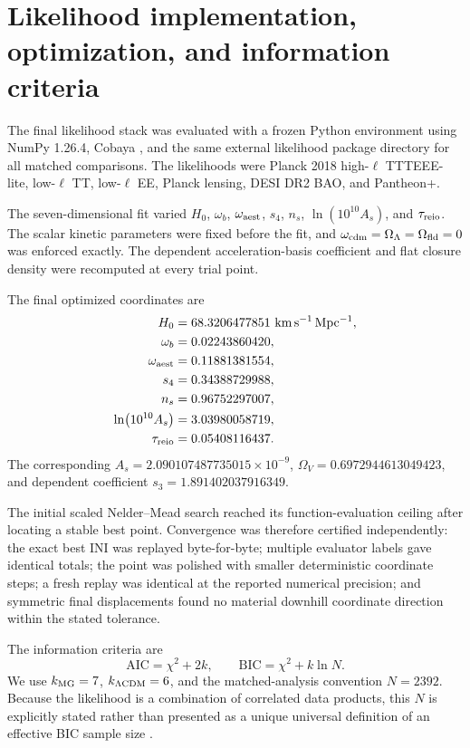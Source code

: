 \section{Likelihood implementation, optimization, and information criteria}\label{app:likelihood}
The final likelihood stack was evaluated with a frozen Python environment using NumPy 1.26.4, Cobaya \cite{TorradoLewis2021}, and the same external likelihood package directory for all matched comparisons. The likelihoods were Planck 2018 high-$\ell$ TTTEEE-lite, low-$\ell$ TT, low-$\ell$ EE, Planck lensing, DESI DR2 BAO, and Pantheon+.

The seven-dimensional fit varied $H_0$, $\omega_b$, $\omega_{\rm aest}$, $s_4$, $n_s$, $\ln(10^{10}A_s)$, and $\tau_{\rm reio}$. The scalar kinetic parameters were fixed before the fit, and $\omega_{\rm cdm}=\Omega_\Lambda=\Omega_{\rm fld}=0$ was enforced exactly. The dependent acceleration-basis coefficient and flat closure density were recomputed at every trial point.

The final optimized coordinates are
\begin{align}
H_0&=68.3206477851\ \mathrm{km\,s^{-1}\,Mpc^{-1}},\\
\omega_b&=0.02243860420,\\
\omega_{\rm aest}&=0.11881381554,\\
s_4&=0.34388729988,\\
n_s&=0.96752297007,\\
\ln(10^{10}A_s)&=3.03980058719,\\
\tau_{\rm reio}&=0.05408116437.
\end{align}
The corresponding $A_s=2.090107487735015\times10^{-9}$, $\Omega_V=0.6972944613049423$, and dependent coefficient $s_3=1.891402037916349$.

The initial scaled Nelder--Mead search reached its function-evaluation ceiling after locating a stable best point. Convergence was therefore certified independently: the exact best INI was replayed byte-for-byte; multiple evaluator labels gave identical totals; the point was polished with smaller deterministic coordinate steps; a fresh replay was identical at the reported numerical precision; and symmetric final displacements found no material downhill coordinate direction within the stated tolerance.

The information criteria are
\begin{equation}
\mathrm{AIC}=\chi^2+2k,\qquad
\mathrm{BIC}=\chi^2+k\ln N.
\end{equation}
We use $k_{\rm MG}=7$, $k_{\Lambda\mathrm{CDM}}=6$, and the matched-analysis convention $N=2392$. Because the likelihood is a combination of correlated data products, this $N$ is explicitly stated rather than presented as a unique universal definition of an effective BIC sample size \cite{Liddle2007}.
